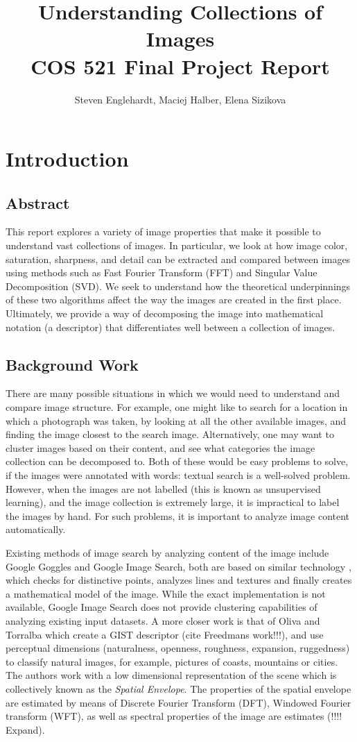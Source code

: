 \documentclass{report}
\author{Steven Englehardt, Maciej Halber, Elena Sizikova}
\title{Understanding Collections of Images \\ \small{COS 521 Final Project Report}}
\begin{document}
\maketitle
\tableofcontents

\chapter{Introduction}
\section{Abstract}
This report explores a variety of image properties that make it possible to understand vast collections of images. In particular, we look at how image color, saturation, sharpness, and detail can be extracted and compared between images using methods such as Fast Fourier Transform (FFT) and Singular Value Decomposition (SVD). We seek to understand how the theoretical underpinnings of these two algorithms affect the way the images are created in the first place. Ultimately, we provide a way of decomposing the image into mathematical notation (a descriptor) that differentiates well between a collection of images.

\section{Background Work}
There are many possible situations in which we would need to understand and compare image structure. For example, one might like to search for a location in which a photograph was taken, by looking at all the other available images, and finding the image closest to the search image. Alternatively, one may want to cluster images based on their content, and see what categories the image collection can be decomposed to. Both of these would be easy problems to solve, if the images were annotated with words: textual search is a well-solved problem. However, when the images are not labelled (this is known as unsupervised learning), and the image collection is extremely large, it is impractical to label the images by hand. For such problems, it is important to analyze image content automatically.

Existing methods of image search by analyzing content of the image include Google Goggles and Google Image Search, both are based on similar technology \cite{google_blog}, which checks for distinctive points, analyzes lines and textures and finally creates a mathematical model of the image. While the exact implementation is not available, Google Image Search does not provide clustering capabilities of analyzing existing input datasets. A more closer work is that of Oliva and Torralba \cite{gist_descriptor} which create a GIST descriptor (cite Freedmans work!!!), and use perceptual dimensions (naturalness, openness, roughness, expansion, ruggedness) to classify natural images, for example, pictures of coasts, mountains or cities. The authors work with a low dimensional representation of the scene which is collectively known as the \emph{Spatial Envelope}. The properties of the spatial envelope are estimated by means of Discrete Fourier Transform (DFT), Windowed Fourier transform (WFT), as well as spectral properties of the image are estimates (!!!! Expand). 
\end{document}
